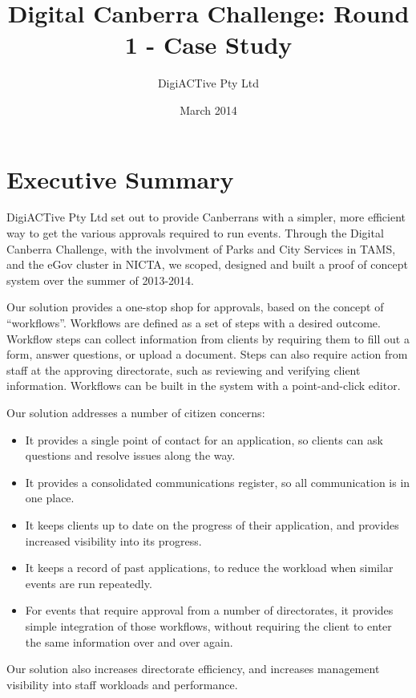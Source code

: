 \documentclass[12pt,a4paper,twosided]{article}
\title{Digital Canberra Challenge: Round 1 - Case Study}
\author{DigiACTive Pty Ltd}
\date{March 2014}
\begin{document}
\maketitle
\newpage
\section{Executive Summary}

DigiACTive Pty Ltd set out to provide Canberrans with a simpler, more
efficient way to get the various approvals required to run events.
Through the Digital Canberra Challenge, with the involvment of Parks and
City Services in TAMS, and the eGov cluster in NICTA, we scoped,
designed and built a proof of concept system over the summer of
2013-2014.

Our solution provides a one-stop shop for approvals, based on the
concept of ``workflows''. Workflows are defined as a set of steps with a
desired outcome. Workflow steps can collect information from clients by
requiring them to fill out a form, answer questions, or upload a
document. Steps can also require action from staff at the approving
directorate, such as reviewing and verifying client information.
Workflows can be built in the system with a point-and-click editor.

Our solution addresses a number of citizen concerns:

\begin{itemize}

\item
  It provides a single point of contact for an application, so clients
  can ask questions and resolve issues along the way.
\item
  It provides a consolidated communications register, so all
  communication is in one place.
\item
  It keeps clients up to date on the progress of their application, and
  provides increased visibility into its progress.
\item
  It keeps a record of past applications, to reduce the workload when
  similar events are run repeatedly.
\item
  For events that require approval from a number of directorates, it
  provides simple integration of those workflows, without requiring the
  client to enter the same information over and over again.
\end{itemize}

Our solution also increases directorate efficiency, and increases
management visibility into staff workloads and performance.
\end{document}

